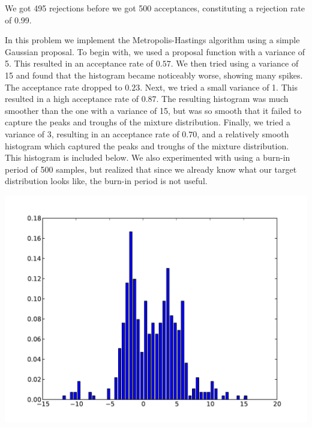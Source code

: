 \documentclass[solution, letterpaper]{cs121}
\begin{document}
\begin{empfile}
We got 495 rejections before we got 500 acceptances, constituting a rejection rate of 0.99.

\subproblem %
In this problem we implement the Metropolis-Hastings algorithm using a simple Gaussian proposal. To begin with, we used a proposal function with a variance of 5. This resulted in an acceptance rate of $0.57$. We then tried using a variance of 15 and found that the histogram became noticeably worse, showing many spikes. The acceptance rate dropped to $0.23$. Next, we tried a small variance of 1. This resulted in a high acceptance rate of $0.87$. The resulting histogram was much smoother than the one with a variance of 15, but was so smooth that it failed to capture the peaks and troughs of the mixture distribution. Finally, we tried a variance of 3, resulting in an acceptance rate of $0.70$, and a relatively smooth histogram which captured the peaks and troughs of the mixture distribution. This histogram is included below. We also experimented with using a burn-in period of 500 samples, but realized that since we already know what our target distribution looks like, the burn-in period is not useful. 

\begin{center}
\includegraphics[scale=0.8]{hasty_metro_histogram.pdf}
\end{center}


\end{empfile}

\immediate{}
\end{document}
